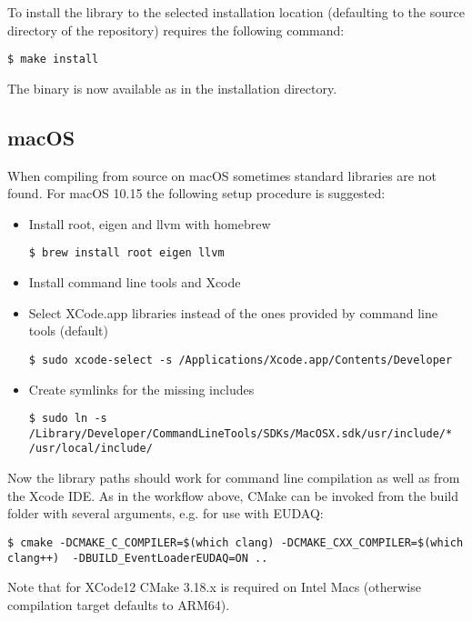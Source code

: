 To install the library to the selected installation location (defaulting to the source directory of the repository) requires the following command:
\begin{verbatim}
$ make install
\end{verbatim}

The binary is now available as  in the installation directory.

\subsection{macOS}
When compiling from source on macOS sometimes standard libraries are not found. For macOS 10.15 the following setup procedure is suggested:
\begin{itemize}
\item Install root, eigen and llvm with homebrew
\begin{verbatim}
$ brew install root eigen llvm
\end{verbatim}
\item Install command line tools and Xcode
\item Select XCode.app libraries instead of the ones provided by command line tools (default)
\begin{verbatim}
$ sudo xcode-select -s /Applications/Xcode.app/Contents/Developer
\end{verbatim}
\item Create symlinks for the missing includes
\begin{verbatim}
$ sudo ln -s /Library/Developer/CommandLineTools/SDKs/MacOSX.sdk/usr/include/* /usr/local/include/
\end{verbatim}
\end{itemize}
Now the library paths should work for command line compilation as well as from the Xcode IDE. As in the workflow above, CMake can be invoked from the build folder with several arguments, e.g. for use with EUDAQ:
\begin{verbatim}
$ cmake -DCMAKE_C_COMPILER=$(which clang) -DCMAKE_CXX_COMPILER=$(which clang++)  -DBUILD_EventLoaderEUDAQ=ON ..
\end{verbatim}
Note that for XCode12 CMake 3.18.x is required on Intel Macs (otherwise compilation target defaults to ARM64).